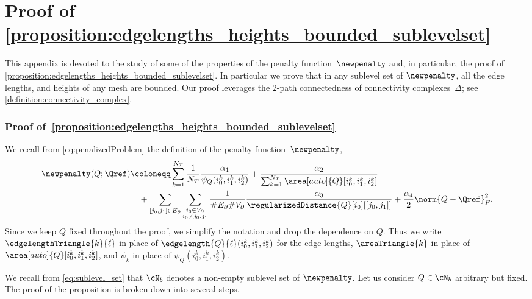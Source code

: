 \appendix

\section{Proof of \texorpdfstring{\cref{proposition:edgelengths_heights_bounded_sublevelset}}{Proposition~\ref{proposition:edgelengths_heights_bounded_sublevelset}}}
\label{appendix:proofs_varphi}

This appendix is devoted to the study of some of the properties of the penalty function~$\newpenalty$ and, in particular, the proof of \cref{proposition:edgelengths_heights_bounded_sublevelset}.
In particular we prove that in any sublevel set of $\newpenalty$, all the edge lengths, and heights of any mesh are bounded.
Our proof leverages the $2$-path connectedness of connectivity complexes~$\Delta$; see \cref{definition:connectivity_complex}.

\subsubsection*{Proof of~\cref{proposition:edgelengths_heights_bounded_sublevelset}}
We recall from \eqref{eq:penalizedProblem} the definition of the penalty function~$\newpenalty$,
\begin{equation*}
	\begin{aligned}
			\newpenalty(Q;\Qref)
			&
			\coloneqq
			\sum_{k=1}^{N_T} \frac{1}{N_T} \frac{\alpha_1}{\psi_Q(i_0^k,i_1^k,i_2^k)}
			+
			\frac{\alpha_2}{\sum_{k=1}^{N_T}\area[auto]{Q}[i_0^k,i_1^k,i_2^k] }
			\\
			&
			\quad
			+
			\sum_{[j_0,j_1] \in E_\partial}
			\sum_{\substack{i_0 \in V_\partial \\ i_0 \neq j_0,j_1}} \frac{1}{\#E_\partial \#V_\partial} \frac{\alpha_3}{\regularizedDistance{Q}[i_0][[j_0,j_1]]}
			+
			\frac{\alpha_4}{2} \norm{Q-\Qref}_F^2
			.
		\end{aligned}
\end{equation*}
Since we keep $Q$ fixed throughout the proof, we simplify the notation and drop the dependence on $Q$.
Thus we write $\edgelengthTriangle{k}{\ell}$ in place of $\edgelength{Q}{\ell}(i_0^k,i_1^k,i_2^k)$ for the edge lengths, $\areaTriangle{k}$ in place of $\area[auto]{Q}[i_0^k,i_1^k,i_2^k]$, and $\psi_k$ in place of $\psi_Q(i_0^k,i_1^k,i_2^k)$.

We recall from \eqref{eq:sublevel_set} that $\cN_b$ denotes a non-empty sublevel set of $\newpenalty$.
Let us consider $Q \in \cN_b$ arbitrary but fixed.
The proof of the proposition is broken down into several steps.


